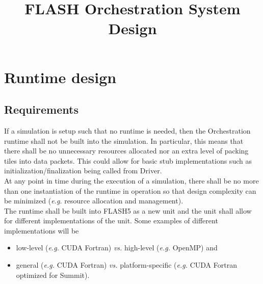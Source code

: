 \documentclass{article}
\title{FLASH Orchestration System Design}
\begin{document}
\maketitle

\section{Runtime design}

\subsection{Requirements}
If a simulation is setup such that no runtime is needed, then the Orchestration
runtime shall not be built into the simulation.  In particular, this means that
there shall be no unnecessary resources allocated nor an extra level of packing
tiles into data packets.  This could allow for basic stub implementations such
as initialization/finalization being called from Driver.\\

At any point in time during the execution of a simulation, there shall be no more
than one instantiation of the runtime in operation so that design complexity can
be minimized (\textit{e.g.} resource allocation and management).\\

The runtime shall be built into FLASH5 as a new unit and the unit shall allow
for different implementations of the unit.  Some examples of different
implementations will be
\begin{itemize}
\item{low-level (\textit{e.g.} CUDA Fortran) \textit{vs.} high-level
(\textit{e.g.} OpenMP) and}
\item{general (\textit{e.g.} CUDA Fortran) \textit{vs.}} platform-specific
(\textit{e.g.} CUDA Fortran optimized for Summit).
\end{itemize}
\end{document}
